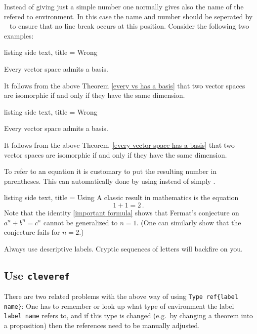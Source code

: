 \documentclass[a4paper, 10pt, headings=standardclasses, oneside, bibliography=totocnumbered]{scrbook}
\begin{document}
Instead of giving just a simple number one normally gives also the name of the refered to environment.
In this case the name and number should be seperated by \texttt{~} to ensure that no line break occurs at this position.
Consider the following two examples:
\begin{tcblisting}{listing side text, title = {Wrong}}
\begin{theorem}
    \label{every vs has a basis}
    Every vector space admits a basis.
\end{theorem}
It follows from the above Theorem \ref{every vs has a basis} that two vector spaces are isomorphic if and only if they have the same dimension.
\end{tcblisting}
\begin{tcblisting}{listing side text, title = {Wrong}}
\begin{theorem}
    \label{every vector space has a basis}
    Every vector space admits a basis.
\end{theorem}
It follows from the above Theorem~\ref{every vector space has a basis} that two vector spaces are isomorphic if and only if they have the same dimension.
\end{tcblisting}

To refer to an equation it is customary to put the resulting number in parentheses.
This can automatically done by using  instead of simply .
\begin{tcblisting}{listing side text, title = {Using }}
  A classic result in mathematics is the equation
  \begin{equation}
    \label{important formula}
    1 + 1 = 2 \,.
  \end{equation}
  Note that the identity \eqref{important formula} shows that Fermat’s conjecture on $a^n + b^n = c^n$ cannot be generalized to $n = 1$.
  (One can similarly show that the conjecture fails for $n = 2$.)
\end{tcblisting}

Always use descriptive labels.
Cryptic sequences of letters will backfire on you.


\subsection{Use \texttt{cleveref}}

There are two related problems with the above way of using \texttt{Type~{\tbs}ref\{label name\}}:
One has to remember or look up what type of environment the label \texttt{label name} refers to, and if this type is changed (e.g.\ by changing a theorem into a proposition) then the references need to be manually adjusted.
\end{document}
